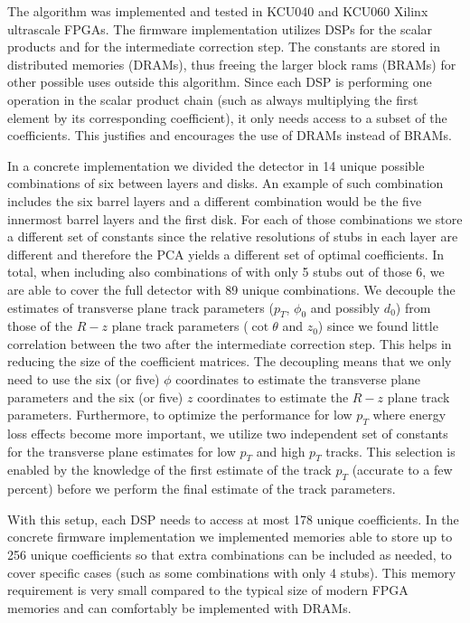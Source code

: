 \documentclass[10pt,a4paper]{report}
\begin{document}
The algorithm was implemented and tested in KCU040 and KCU060 Xilinx ultrascale FPGAs. The firmware implementation utilizes DSPs for the scalar products and for the intermediate correction step. The constants are stored in distributed memories (DRAMs), thus freeing the larger block rams (BRAMs) for other possible uses outside this algorithm. Since each DSP is performing one operation in the scalar product chain (such as always multiplying the first element by its corresponding coefficient), it only needs access to a subset of the coefficients. This justifies and encourages the use of DRAMs instead of BRAMs.

In a concrete implementation we divided the detector in 14 unique possible combinations of six between layers and disks. An example of such combination includes the six barrel layers and a different combination would be the five innermost barrel layers and the first disk. For each of those combinations we store a different set of constants since the relative resolutions of stubs in each layer are different and therefore the PCA yields a different set of optimal coefficients. In total, when including also combinations of with only 5 stubs out of those 6, we are able to cover the full detector with 89 unique combinations. We decouple the estimates of transverse plane track parameters ($p_T$, $\phi_0$ and possibly $d_0$) from those of the $R-z$ plane track parameters ($\cot\theta$ and $z_0$) since we found little correlation between the two after the intermediate correction step. This helps in reducing the size of the coefficient matrices. The decoupling means that we only need to use the six (or five) $\phi$ coordinates to estimate the transverse plane parameters and the six (or five) $z$ coordinates to estimate the $R-z$ plane track parameters. Furthermore, to optimize the performance for low $p_T$ where energy loss effects become more important, we utilize two independent set of constants for the transverse plane estimates for low $p_T$ and high $p_T$ tracks. This selection is enabled by the knowledge of the first estimate of the track $p_T$ (accurate to a few percent) before we perform the final estimate of the track parameters.

With this setup, each DSP needs to access at most 178 unique coefficients. In the concrete firmware implementation we implemented memories able to store up to 256 unique coefficients so that extra combinations can be included as needed, to cover specific cases (such as some combinations with only 4 stubs). This memory requirement is very small compared to the typical size of modern FPGA memories and can comfortably be implemented with DRAMs.
\end{document}
